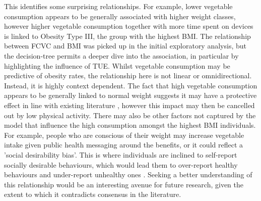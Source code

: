 This identifies some surprising relationships. For example, lower vegetable consumption appears to be generally associated with higher weight classes, however higher vegetable consumption together with more time spent on devices is linked to Obesity Type III, the group with the highest BMI. The relationship between FCVC and BMI was picked up in the initial exploratory analysis, but the decision-tree permits a deeper dive into the association, in particular by highlighting the influence of TUE. Whilst vegetable consumption may be predictive of obesity rates, the relationship here is not linear or omnidirectional. Instead, it is highly context dependent. The fact that high vegetable consumption appears to be generally linked to normal weight suggests it may have a protective effect in line with existing literature \cite{Nour2018}, however this impact may then be cancelled out by low physical activity. There may also be other factors not captured by the model that influence the high consumption amongst the highest BMI individuals. For example, people who are conscious of their weight may increase vegetable intake given public health messaging around the benefits, or it could reflect a 'social desirability bias'. This is where individuals are inclined to self-report socially desirable behaviours, which would lead them to over-report healthy behaviours and under-report unhealthy ones \cite{Hebert1995}. Seeking a better understanding of this relationship would be an interesting avenue for future research, given the extent to which it contradicts consensus in the literature. 
